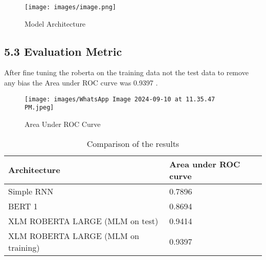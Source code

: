 \documentclass{article}
\begin{document}
\begin{figure}[H]
    \centering
    \texttt{[image: images/image.png]}
    \caption{Model Architecture}
\end{figure}


\subsection*{5.3 Evaluation Metric }
After fine tuning the roberta on the training data not the test data to remove any bias the Area under ROC curve was 0.9397 . 

\begin{figure}[H]
    \centering
    \texttt{[image: images/WhatsApp Image 2024-09-10 at 11.35.47 PM.jpeg]}
    \caption{Area Under ROC Curve}
\end{figure}






\begin{table}[ht]
    \centering
    \begin{tabularx}{\textwidth}{|X|X|}
        \hline
        \textbf{Architecture} & \textbf{Area under ROC curve} \\ \hline
        Simple RNN & 0.7896 \\ \hline
        BERT 1 & 0.8694 \\ \hline
        XLM ROBERTA LARGE (MLM on test) & 0.9414 \\ \hline
        XLM ROBERTA LARGE (MLM on training) & 0.9397 \\ \hline
    \end{tabularx}
    \caption{Comparison of the results}
    \label{tab:full_width_table}
\end{table}

\end{document}
